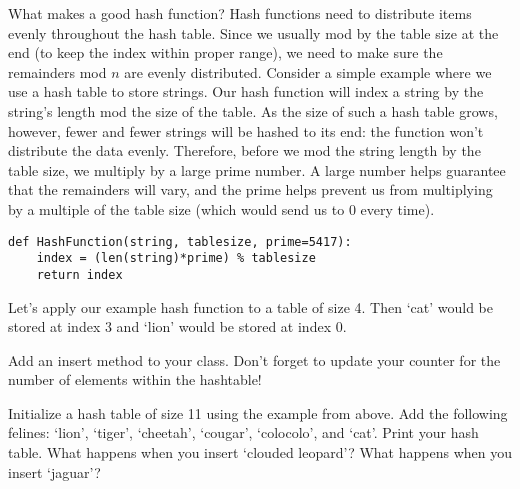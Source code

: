 What makes a good hash function?
Hash functions need to distribute items evenly throughout the hash table.
Since we usually mod by the table size at the end (to keep the index within proper range), we need to make sure the remainders mod $n$ are evenly distributed.
Consider a simple example where we use a hash table to store strings.
Our hash function will index a string by the string's length mod the size of the table.
As the size of such a hash table grows, however,  fewer and fewer strings will be hashed to its end: the function won't distribute the data evenly.
Therefore, before we mod the string length by the table size, we multiply by a large prime number.
A large number helps guarantee that the remainders will vary, and the prime helps prevent us from multiplying by a multiple of the table size (which would send us to $0$ every time).
\begin{lstlisting}
def HashFunction(string, tablesize, prime=5417):
    index = (len(string)*prime) % tablesize
    return index
\end{lstlisting}
Let's apply our example hash function to a table of size 4.
Then `cat' would be stored at index $3$ and `lion' would be stored at index $0$.
\begin{center}
\end{center}
\begin{problem}
Add an insert method to your  class. Don't forget to update your counter for the number of elements within the hashtable!

Initialize a hash table of size 11 using the example  from above.
Add the following felines: `lion', `tiger', `cheetah', `cougar', `colocolo', and `cat'.
Print your hash table. What happens when you insert `clouded leopard'?
What happens when you insert `jaguar'?
\label{Prob:Basic hash insert}
\end{problem}

